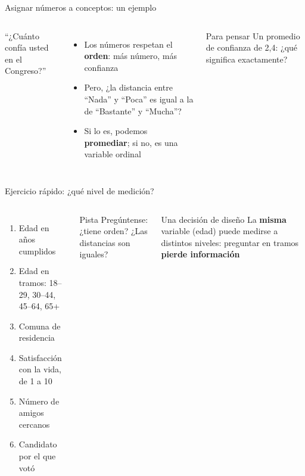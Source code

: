\documentclass[aspectratio=169,11pt]{beamer}
\newcommand{\hl}[1]{\textcolor{marino}{\textbf{#1}}}        %
\begin{document}
\begin{frame}{Asignar números a conceptos: un ejemplo}
\begin{columns}[T]
``¿Cuánto confía usted en el Congreso?''
\bigskip

\centering
{}
\begin{itemize}
  \item Los números respetan el \textbf{orden}: más número, más confianza
  \item Pero, ¿la distancia entre ``Nada'' y ``Poca'' es igual a la de ``Bastante'' y ``Mucha''?
  \item Si lo es, podemos \hl{promediar}; si no, es una variable ordinal
\end{itemize}
\bigskip
\begin{exampleblock}{Para pensar}
\small
Un promedio de confianza de 2,4: ¿qué significa exactamente?
\end{exampleblock}
\end{columns}
\end{frame}

\begin{frame}{Ejercicio rápido: ¿qué nivel de medición?}
\begin{columns}[T]
\begin{enumerate}
  \item Edad en años cumplidos
  \item Edad en tramos: 18--29, 30--44, 45--64, 65+
  \item Comuna de residencia
  \item Satisfacción con la vida, de 1 a 10
  \item Número de amigos cercanos
  \item Candidato por el que votó
\end{enumerate}
\begin{block}{Pista}
\small
Pregúntense: ¿tiene orden? ¿Las distancias son iguales?
\end{block}
\bigskip
\begin{alertblock}{Una decisión de diseño}
\small
La \textbf{misma} variable (edad) puede medirse a distintos niveles: preguntar en tramos \textbf{pierde información}
\end{alertblock}
\end{columns}
\end{frame}
\end{document}
